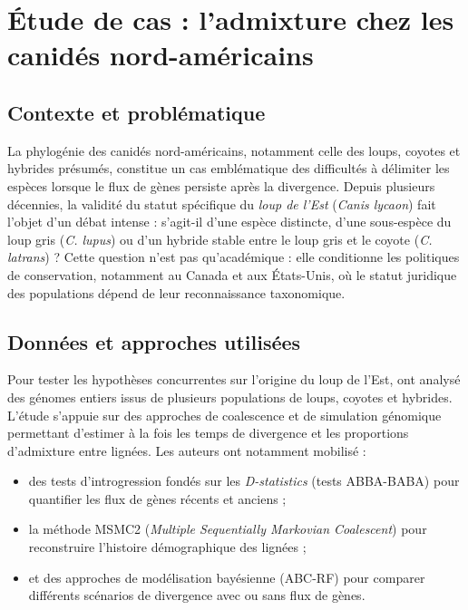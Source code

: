 \documentclass[12pt,a4paper]{article}
\begin{document}
\section{Étude de cas : l’admixture chez les canidés nord-américains}

\subsection{Contexte et problématique}

La phylogénie des canidés nord-américains, notamment celle des loups, coyotes et hybrides présumés, constitue un cas emblématique des difficultés à délimiter les espèces lorsque le flux de gènes persiste après la divergence.
Depuis plusieurs décennies, la validité du statut spécifique du \textit{loup de l’Est} (\textit{Canis lycaon}) fait l’objet d’un débat intense : s’agit-il d’une espèce distincte, d’une sous-espèce du loup gris (\textit{C. lupus}) ou d’un hybride stable entre le loup gris et le coyote (\textit{C. latrans}) ?
Cette question n’est pas qu’académique : elle conditionne les politiques de conservation, notamment au Canada et aux États-Unis, où le statut juridique des populations dépend de leur reconnaissance taxonomique.

\subsection{Données et approches utilisées \parencite{vilaca-2023}}

Pour tester les hypothèses concurrentes sur l’origine du loup de l’Est, \textcite{vilaca-2023} ont analysé des génomes entiers issus de plusieurs populations de loups, coyotes et hybrides.
L’étude s’appuie sur des approches de coalescence et de simulation génomique permettant d’estimer à la fois les temps de divergence et les proportions d’admixture entre lignées.
Les auteurs ont notamment mobilisé :
\begin{itemize}
    \item des tests d’introgression fondés sur les \textit{D-statistics} (tests ABBA-BABA) pour quantifier les flux de gènes récents et anciens ;
    \item la méthode MSMC2 (\textit{Multiple Sequentially Markovian Coalescent}) pour reconstruire l’histoire démographique des lignées ;
    \item et des approches de modélisation bayésienne (ABC-RF) pour comparer différents scénarios de divergence avec ou sans flux de gènes.
\end{itemize}
\end{document}
